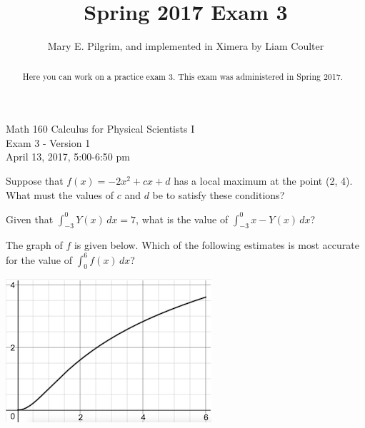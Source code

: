 \documentclass[handout]{ximera}
\author{Mary E. Pilgrim, and implemented in Ximera by Liam Coulter}
\title{Spring 2017 Exam 3}
\begin{document}
\begin{abstract}
  Here you can work on a practice exam 3. This exam was administered in Spring 2017.
\end{abstract}
\maketitle

\begin{center}
\Large{Math 160 Calculus for Physical Scientists I \\ Exam 3 - Version 1 \\ April 13, 2017, 5:00-6:50 pm}
\end{center}



\begin{problem}
Suppose that $f(x) = -2x^2+cx+d$ has a local maximum at the point (2, 4). What must the values of $c$ and $d$ be to satisfy these conditions?
\begin{multipleChoice}
\end{multipleChoice}
\end{problem}


\begin{problem}
Given that $\displaystyle\int_{-3}^0 Y(x) \,dx=7$, what is the value of $\displaystyle\int_{-3}^0 x-Y(x) \,dx$?
\begin{multipleChoice}
\end{multipleChoice}
\end{problem}


\begin{problem}
The graph of $f$ is given below. Which of the following estimates is most accurate for the value of $\displaystyle\int_0^6 f(x)\, dx$?

\includegraphics [scale=0.5]{Area-Ex3.png} %

\begin{multipleChoice}
\end{multipleChoice}
\end{problem}
\end{document}
